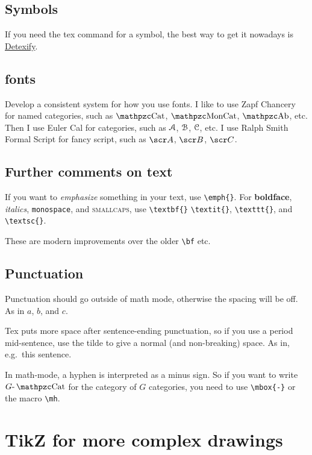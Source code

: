 \documentclass[11pt,oneside,draft]{amsart}
\begin{document}
\subsection{Symbols}

If you need the tex command for a symbol, the best way to get it
nowadays is
\href{http://detexify.kirelabs.org/classify.html}{Detexify}.

\subsection{fonts}

Develop a consistent system for how you use fonts.  I like to use Zapf
Chancery for named categories, such as $\Cat$, $\MonCat$, $\Ab$, etc.
Then I use Euler Cal for categories, such as $\mathcal{A}$, $\mathcal{B}$, $\mathcal{C}$,
etc.  I use Ralph Smith Formal Script for fancy script, such as $\sA$,
$\sB$, $\sC$.


\subsection{Further comments on text}

If you want to \emph{emphasize} something in your text, use
\verb|\emph{}|.  For \textbf{boldface}, \textit{italics},
\texttt{monospace}, and \textsc{smallcaps}, use \verb|\textbf{}|
\verb|\textit{}|, \verb|\texttt{}|, and \verb|\textsc{}|.

These are modern improvements over the older \verb|\bf| etc.

\subsection{Punctuation}

Punctuation should go outside of math mode, otherwise the spacing will
be off.  As in $a$, $b$, and $c$.

Tex puts more space after sentence-ending punctuation, so if you use a
period mid-sentence, use the tilde to give a normal (and non-breaking)
space.  As in, e.g.~this sentence.

In math-mode, a hyphen is interpreted as a minus sign.  So if you want
to write $G\mh\Cat$ for the category of $G$ categories, you need to
use \verb|\mbox{-}| or the macro \verb|\mh|.


\section{TikZ for more complex drawings}
\end{document}
